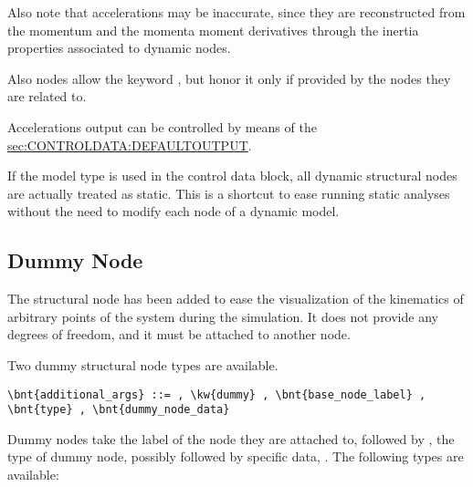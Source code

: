 Also note that accelerations may be inaccurate, since they are reconstructed
from the momentum and the momenta moment derivatives through the inertia
properties associated to dynamic nodes.

Also  nodes allow the keyword ,
but honor it only if provided by the nodes they are related to.

Accelerations output can be controlled by means of the
\hyperref{\kw{default output} statement}{\kw{default output} statement (see Section~}{)}{sec:CONTROLDATA:DEFAULTOUTPUT}.

If the  model type is used in the control data block,
all dynamic structural nodes are actually treated as static.
This is a shortcut to ease running static analyses without the need
to modify each node of a dynamic model.

\subsection{Dummy Node}
\label{sec:NODE:STRUCTURAL:DUMMY}
The  structural node has been added to ease the visualization
of the kinematics of arbitrary points of the system
during the simulation. 
It does not provide any degrees of freedom, and it must be attached
to another node.

Two dummy structural node types are available.
\begin{Verbatim}[commandchars=\\\{\}]
    \bnt{additional_args} ::= , \kw{dummy} , \bnt{base_node_label} , \bnt{type} , \bnt{dummy_node_data}
\end{Verbatim}

Dummy nodes take the label  of the node they are attached to, 
followed by , the type of dummy node, possibly followed by specific data,
.
The following types are available:

